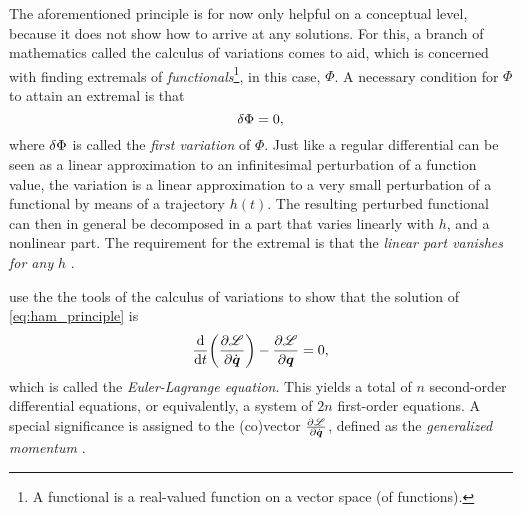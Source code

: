 The aforementioned principle is for now only helpful on a conceptual level, because it does not show how to arrive at any solutions. For this, a branch of mathematics called the calculus of variations comes to aid, which is concerned with finding extremals of \emph{functionals}\footnote{A functional is a real-valued function on a vector space (of functions).}, in this case, \(\Phi\). A necessary condition for \(\Phi\) to attain an extremal is that 
\[ \var{\Phi} = 0,\]
where \(\var{\Phi}\) is called the \emph{first variation} of \(\Phi\). Just like a regular differential can be seen as a linear approximation to an infinitesimal perturbation of a function value, the variation is a linear approximation to a very small perturbation of a functional by means of a trajectory \(h(t)\). The resulting perturbed functional can then in general be decomposed in a part that varies linearly with \(h\), and a nonlinear part. The requirement for the extremal is that the \emph{linear part vanishes for any} \(h\) \cite{Arnold1989}.

\citet{Landau1960} use the the tools of the calculus of variations to show that the solution of \cref{eq:ham_principle} is
\[ \dv{}{t}\qty(\pdv{\ensuremath{\mathscr{L}}}{\ensuremath{\dot{\vb*{q}}}}) - \pdv{\ensuremath{\mathscr{L}}}{\ensuremath{\vb*{q}}} = 0, \]
which is called the \emph{Euler-Lagrange equation}.
This yields a total of \(n\) second-order differential equations, or equivalently, a system of \(2n\) first-order equations. A special significance is assigned to the (co)vector $\pdv{\ensuremath{\mathscr{L}}}{\ensuremath{\dot{\vb*{q}}}}$, defined as the \emph{generalized momentum} .


